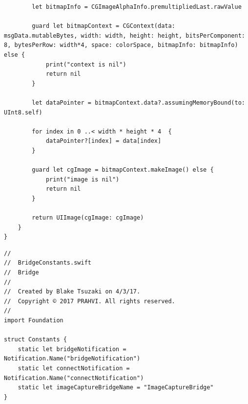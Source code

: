 \begin{lstlisting}
        let bitmapInfo = CGImageAlphaInfo.premultipliedLast.rawValue
        
        guard let bitmapContext = CGContext(data: msgData.mutableBytes, width: width, height: height, bitsPerComponent: 8, bytesPerRow: width*4, space: colorSpace, bitmapInfo: bitmapInfo) else {
            print("context is nil")
            return nil
        }
        
        let dataPointer = bitmapContext.data?.assumingMemoryBound(to: UInt8.self)
        
        for index in 0 ..< width * height * 4  {
            dataPointer?[index] = data[index]
        }
        
        guard let cgImage = bitmapContext.makeImage() else {
            print("image is nil")
            return nil
        }
        
        return UIImage(cgImage: cgImage)
    }
}
\end{lstlisting}

\begin{lstlisting}
//
//  BridgeConstants.swift
//  Bridge
//
//  Created by Blake Tsuzaki on 4/3/17.
//  Copyright © 2017 PRAHVI. All rights reserved.
//
import Foundation

struct Constants {
    static let bridgeNotification = Notification.Name("bridgeNotification")
    static let connectNotification = Notification.Name("connectNotification")
    static let imageCaptureBridgeName = "ImageCaptureBridge"
}

\end{lstlisting}


